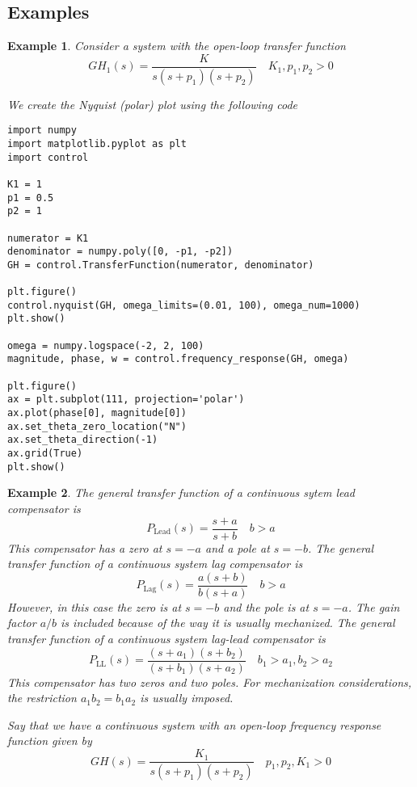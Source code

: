 \documentclass[11pt]{book}
\theoremstyle{example}
\newtheorem{example}{Example}[section]
\begin{document}
\subsection{Examples}

\begin{example}
	Consider a system with the open-loop transfer function
	\begin{equation}
		GH_1(s)=\frac{K}{s(s+p_1)(s+p_2)}\quad{K_1,p_1,p_2>0}
	\end{equation}

	We create the Nyquist (polar) plot using the following code
\begin{verbatim}
import numpy
import matplotlib.pyplot as plt
import control

K1 = 1
p1 = 0.5
p2 = 1

numerator = K1
denominator = numpy.poly([0, -p1, -p2])
GH = control.TransferFunction(numerator, denominator)

plt.figure()
control.nyquist(GH, omega_limits=(0.01, 100), omega_num=1000)
plt.show()

omega = numpy.logspace(-2, 2, 100)
magnitude, phase, w = control.frequency_response(GH, omega)

plt.figure()
ax = plt.subplot(111, projection='polar')
ax.plot(phase[0], magnitude[0])
ax.set_theta_zero_location("N")
ax.set_theta_direction(-1)
ax.grid(True)
plt.show()
\end{verbatim}

\end{example}

\begin{example}
	The general transfer function of a continuous sytem lead compensator is
	\begin{equation}
		P_\mathrm{Lead}(s)=\frac{s+a}{s+b}\quad{b>a}
	\end{equation}
	This compensator has a zero at $s=-a$ and a pole at $s=-b$. The general transfer function of a continuous system lag compensator is
	\begin{equation}
		P_\mathrm{Lag}(s)=\frac{a(s+b)}{b(s+a)}\quad{b>a}
	\end{equation}
	However, in this case the zero is at $s=-b$ and the pole is at $s=-a$. The gain factor $a/b$ is included because of the way it is usually mechanized. The general transfer function of a continuous system lag-lead compensator is
	\begin{equation}
		P_\mathrm{LL}(s)=\frac{(s+a_1)(s+b_2)}{(s+b_1)(s+a_2)}\quad{b_1>a_1,b_2>a_2}
	\end{equation}
	This compensator has two zeros and two poles. For mechanization considerations, the restriction $a_1b_2=b_1a_2$ is usually imposed.
	
	Say that we have a continuous system with an open-loop frequency response function given by
	\begin{equation}
		GH(s)=\frac{K_1}{s(s+p_1)(s+p_2)}\quad{p_1,p_2,K_1>0}
	\end{equation}
	
\end{example}
\end{document}
